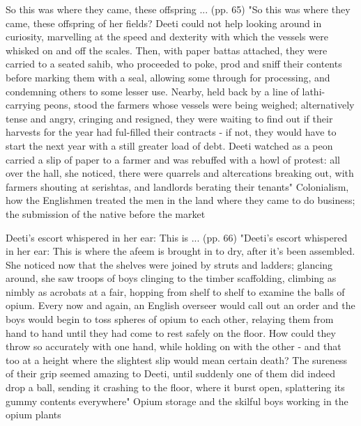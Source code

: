 So this was where they came, these offspring ... (pp. 65)
"So this was where they came, these offspring of her fields? Deeti could not help looking around in curiosity, marvelling at the speed and dexterity with which the vessels were whisked on and off the scales. Then, with paper battas attached, they were carried to a seated sahib, who proceeded to poke, prod and sniff their contents before marking them with a seal, allowing some through for processing, and condemning others to some lesser use. Nearby, held back by a line of lathi-carrying peons, stood the farmers whose vessels were being weighed; alternatively tense and angry, cringing and resigned, they were waiting to find out if their harvests for the year had ful-filled their contracts - if not, they would have to start the next year with a still greater load of debt. Deeti watched as a peon carried a slip of paper to a farmer and was rebuffed with a howl of protest: all over the hall, she noticed, there were quarrels and altercations breaking out, with farmers shouting at serishtas, and landlords berating their tenants"
Colonialism, how the Englishmen treated the men in the land where they came to do business; the submission of the native before the market

Deeti’s escort whispered in her ear: This is ... (pp. 66)
"Deeti’s escort whispered in her ear: This is where the afeem is brought in to dry, after it’s been assembled. She noticed now that the shelves were joined by struts and ladders; glancing around, she saw troops of boys clinging to the timber scaffolding, climbing as nimbly as acrobats at a fair, hopping from shelf to shelf to examine the balls of opium. Every now and again, an English overseer would call out an order and the boys would begin to toss spheres of opium to each other, relaying them from hand to hand until they had come to rest safely on the floor. How could they throw so accurately with one hand, while holding on with the other - and that too at a height where the slightest slip would mean certain death? The sureness of their grip seemed amazing to Deeti, until suddenly one of them did indeed drop a ball, sending it crashing to the floor, where it burst open, splattering its gummy contents everywhere"
Opium storage and the skilful boys working in the opium plants

